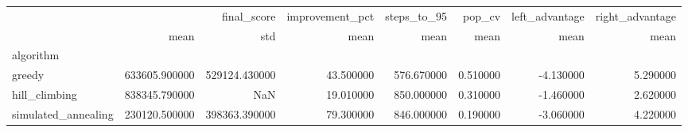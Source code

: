 \begin{tabular}{lrrrrrrr}
\toprule
 & \multicolumn{2}{r}{final_score} & improvement_pct & steps_to_95 & pop_cv & left_advantage & right_advantage \\
 & mean & std & mean & mean & mean & mean & mean \\
algorithm &  &  &  &  &  &  &  \\
\midrule
greedy & 633605.900000 & 529124.430000 & 43.500000 & 576.670000 & 0.510000 & -4.130000 & 5.290000 \\
hill_climbing & 838345.790000 & NaN & 19.010000 & 850.000000 & 0.310000 & -1.460000 & 2.620000 \\
simulated_annealing & 230120.500000 & 398363.390000 & 79.300000 & 846.000000 & 0.190000 & -3.060000 & 4.220000 \\
\bottomrule
\end{tabular}

